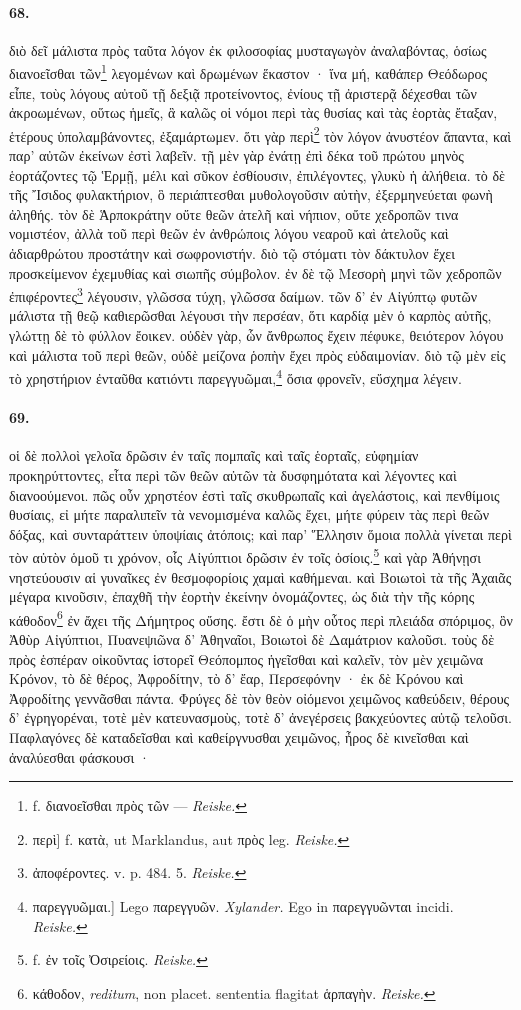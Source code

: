 \documentclass[a4paper, 11pt, oneside, polutonikogreek, german, landscape]{article}
\begin{document}
\paragraph{68.}
διὸ δεῖ μάλιστα πρὸς ταῦτα λόγον ἐκ φιλοσοφίας μυσταγωγὸν ἀναλαβόντας, ὁσίως διανοεῖσθαι τῶν\footnote{f. διανοεῖσθαι πρὸς τῶν --- \emph{Reiske.}} λεγομένων καὶ δρωμένων ἕκαστον · ἵνα μή, καθάπερ Θεόδωρος εἶπε, τοὺς λόγους αὐτοῦ τῇ δεξιᾷ προτείνοντος, ἐνίους τῇ ἀριστερᾷ δέχεσθαι τῶν ἀκροωμένων, οὕτως ἡμεῖς, ἃ καλῶς οἱ νόμοι περὶ τὰς θυσίας καὶ τὰς ἑορτὰς ἔταξαν, ἑτέρους ὑπολαμβάνοντες, ἐξαμάρτωμεν. ὅτι γὰρ περὶ\footnote{περὶ] f. κατὰ, ut Marklandus, aut πρὸς leg. \emph{Reiske.}} τὸν λόγον ἀνυστέον ἅπαντα, καὶ παρ' αὐτῶν ἐκείνων ἐστὶ λαβεῖν. τῇ μὲν γὰρ ἐνάτῃ ἐπὶ δέκα τοῦ πρώτου μηνὸς ἑορτάζοντες τῷ Ἑρμῇ, μέλι καὶ σῦκον ἐσθίουσιν, ἐπιλέγοντες, γλυκὺ ἡ ἀλήθεια. τὸ δὲ τῆς Ἴσιδος φυλακτήριον, ὃ περιάπτεσθαι μυθολογοῦσιν αὐτὴν, ἐξερμηνεύεται φωνὴ ἀληθής. τὸν δὲ Ἁρποκράτην οὔτε θεῶν ἀτελῆ καὶ νήπιον, οὔτε χεδροπῶν τινα νομιστέον, ἀλλὰ τοῦ περὶ θεῶν ἐν ἀνθρώποις λόγου νεαροῦ καὶ ἀτελοῦς καὶ ἀδιαρθρώτου προστάτην καὶ σωφρονιστήν. διὸ τῷ στόματι τὸν δάκτυλον ἔχει προσκείμενον ἐχεμυθίας καὶ σιωπῆς σύμβολον. ἐν δὲ τῷ Μεσορὴ μηνὶ τῶν χεδροπῶν ἐπιφέροντες\footnote{ἀποφέροντες. v. p. 484. 5. \emph{Reiske.}} λέγουσιν, γλῶσσα τύχη, γλῶσσα δαίμων. τῶν δ' ἐν Αἰγύπτῳ φυτῶν μάλιστα τῇ θεῷ καθιερῶσθαι λέγουσι τὴν περσέαν, ὅτι καρδίᾳ μὲν ὁ καρπὸς αὐτῆς, γλώττῃ δὲ τὸ φύλλον ἔοικεν. οὐδὲν γὰρ, ὧν ἄνθρωπος ἔχειν πέφυκε, θειότερον λόγου καὶ μάλιστα τοῦ περὶ θεῶν, οὐδὲ μείζονα ῥοπὴν ἔχει πρὸς εὐδαιμονίαν. διὸ τῷ μὲν εἰς τὸ χρηστήριον ἐνταῦθα κατιόντι παρεγγυῶμαι,\footnote{παρεγγυῶμαι.] Lego παρεγγυῶν. \emph{Xylander.} Ego in παρεγγυῶνται incidi. \emph{Reiske.}} ὅσια φρονεῖν, εὔσχημα λέγειν.

\paragraph{69.}
οἱ δὲ πολλοὶ γελοῖα δρῶσιν ἐν ταῖς πομπαῖς καὶ ταῖς ἑορταῖς, εὐφημίαν προκηρύττοντες, εἶτα περὶ τῶν θεῶν αὐτῶν τὰ δυσφημότατα καὶ λέγοντες καὶ διανοούμενοι. πῶς οὖν χρηστέον ἐστὶ ταῖς σκυθρωπαῖς καὶ ἀγελάστοις, καὶ πενθίμοις θυσίαις, εἰ μήτε παραλιπεῖν τὰ νενομισμένα καλῶς ἔχει, μήτε φύρειν τὰς περὶ θεῶν δόξας, καὶ συνταράττειν ὑποψίαις ἀτόποις; καὶ παρ' Ἕλλησιν ὅμοια πολλὰ γίνεται περὶ τὸν αὐτὸν ὁμοῦ τι χρόνον, οἷς Αἰγύπτιοι δρῶσιν ἐν τοῖς ὁσίοις.\footnote{f. ἐν τοῖς Ὀσιρείοις. \emph{Reiske.}} καὶ γὰρ Ἀθήνῃσι νηστεύουσιν αἱ γυναῖκες ἐν θεσμοφορίοις χαμαὶ καθήμεναι. καὶ Βοιωτοὶ τὰ τῆς Ἀχαιᾶς μέγαρα κινοῦσιν, ἐπαχθῆ τὴν ἑορτὴν ἐκείνην ὀνομάζοντες, ὡς διὰ τὴν τῆς κόρης κάθοδον\footnote{κάθοδον, \emph{reditum}, non placet. sententia flagitat ἁρπαγὴν. \emph{Reiske.} } ἐν ἄχει τῆς Δήμητρος οὔσης. ἔστι δὲ ὁ μὴν οὗτος περὶ πλειάδα σπόριμος, ὃν Ἀθὺρ Αἰγύπτιοι, Πυανεψιῶνα δ' Ἀθηναῖοι, Βοιωτοὶ δὲ Δαμάτριον καλοῦσι. τοὺς δὲ πρὸς ἑσπέραν οἰκοῦντας ἱστορεῖ Θεόπομπος ἡγεῖσθαι καὶ καλεῖν, τὸν μὲν χειμῶνα Κρόνον, τὸ δὲ θέρος, Ἀφροδίτην, τὸ δ' ἔαρ, Περσεφόνην · ἐκ δὲ Κρόνου καὶ Ἀφροδίτης γεννᾶσθαι πάντα. Φρύγες δὲ τὸν θεὸν οἰόμενοι χειμῶνος καθεύδειν, θέρους δ' ἐγρηγορέναι, τοτὲ μὲν κατευνασμοὺς, τοτὲ δ' ἀνεγέρσεις βακχεύοντες αὐτῷ τελοῦσι. Παφλαγόνες δὲ καταδεῖσθαι καὶ καθείργνυσθαι χειμῶνος, ἦρος δὲ κινεῖσθαι καὶ ἀναλύεσθαι φάσκουσι ·
\end{document}
